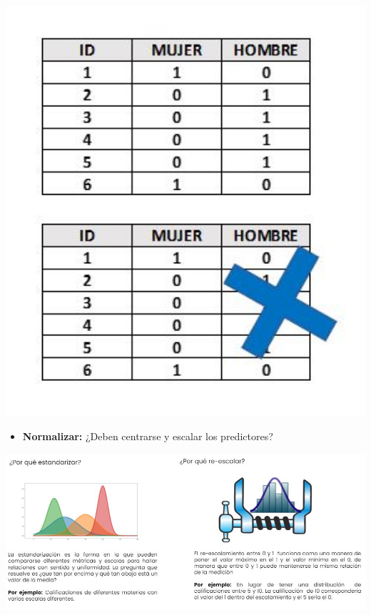 \documentclass[
]{book}
\providecommand{\tightlist}{%
  \setlength{\itemsep}{0pt}\setlength{\parskip}{0pt}}
\begin{document}
\begin{center}\includegraphics[width=400pt]{img/04-ml/descorrelaciones} \end{center}

\begin{itemize}
\tightlist
\item
  \textbf{Normalizar:} ¿Deben centrarse y escalar los predictores?
\end{itemize}

\begin{center}\includegraphics[width=800pt]{img/04-ml/estandarizar-reescalar} \end{center}
\end{document}
